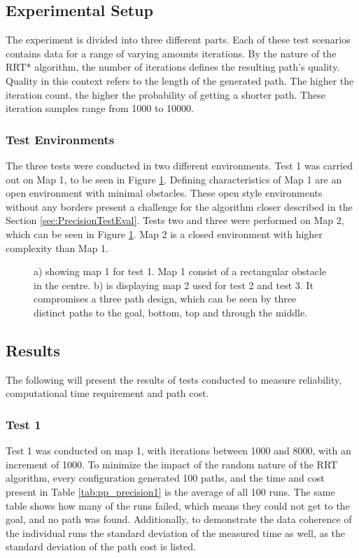 \subsection{Experimental Setup}
The experiment is divided into three different parts. Each of these test scenarios contains data for a range of varying amounts iterations. By the nature of the RRT* algorithm, the number of iterations defines the resulting path's quality. Quality in this context refers to the length of the generated path. The higher the iteration count, the higher the probability of getting a shorter path. These iteration samples range from 1000 to 10000. 

\subsubsection{Test Environments}

The three tests were conducted in two different environments. Test 1 was carried out on Map 1, to be seen in Figure \ref{fig:PrecisionTestMaps}. Defining characteristics of Map 1 are an open environment with minimal obstacles. These open style environments without any borders present a challenge for the algorithm closer described in the Section \ref{sec:PrecisionTestEval}. Tests two and three were performed on Map 2, which can be seen in Figure \ref{fig:PrecisionTestMaps}. Map 2 is a closed environment with higher complexity than Map 1.  

\begin{figure}[h]
	\centering
	
	\caption{a) showing map 1 for test 1. Map 1 consist of a rectangular obstacle in the centre. b) is displaying map 2 used for test 2 and test 3. It compromises a three path design, which can be seen by three distinct paths to the goal, bottom, top and through the middle.}
	\label{fig:PrecisionTestMaps}
\end{figure}


\subsection{Results}
\label{sec:PrecisionTestResults}
The following will present the results of tests conducted to measure reliability, computational time requirement and path cost.

\subsubsection{Test 1}
\label{sec:test1}
Test 1 was conducted on map 1, with iterations between 1000 and 8000, with an increment of 1000. To minimize the impact of the random nature of the RRT algorithm, every configuration generated 100 paths, and the time and cost present in Table \ref{tab:pp_precision1} is the average of all 100 runs. The same table shows how many of the runs failed, which means they could not get to the goal, and no path was found. Additionally, to demonstrate the data coherence of the individual runs the standard deviation of the measured time as well, as the standard deviation of the path cost is listed.   

